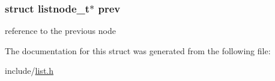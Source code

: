 \subsubsection[{\texorpdfstring{prev}{prev}}]{\setlength{\rightskip}{0pt plus 5cm}struct {\bf listnode\+\_\+t}$\ast$ prev}\hypertarget{structlistnode__t_a4b114c5c941f37023b31fea9af3f48ea}{}\label{structlistnode__t_a4b114c5c941f37023b31fea9af3f48ea}
reference to the previous node 

The documentation for this struct was generated from the following file\+:\begin{DoxyCompactItemize}
\item 
include/\hyperlink{list_8h}{list.\+h}\end{DoxyCompactItemize}
